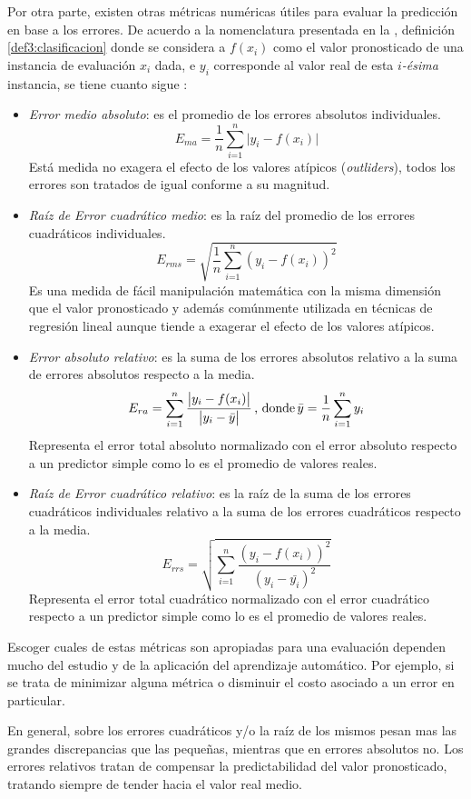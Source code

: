 Por otra parte, existen otras métricas numéricas útiles para evaluar
la predicción en base a los errores. De acuerdo a la nomenclatura
presentada en la , definición \ref{def3:clasificacion}
donde se considera a $f(x_{i})$ como el valor pronosticado de una
instancia de evaluación $x_{i}$ dada, e $y_{i}$ corresponde al valor
real de esta \emph{$i$-ésima} instancia, se tiene cuanto sigue \cite{Witten2017}:
\begin{itemize}
\item \emph{Error medio absoluto}: es el promedio de los errores absolutos
individuales.
\[
E_{ma}=\frac{1}{n}\sum_{i\text{=1}}^{n}\bigl|y_{i}-f(x_{i})\bigr|
\]
Está medida no exagera el efecto de los valores atípicos (\emph{outliders}),
todos los errores son tratados de igual conforme a su magnitud.
\item \emph{Raíz de Error cuadrático medio}: es la raíz del promedio de
los errores cuadráticos individuales.
\[
E_{rms}=\sqrt{\frac{1}{n}\sum_{i\text{=1}}^{n}\left(y_{i}-f(x_{i})\right)^{2}}
\]
Es una medida de fácil manipulación matemática con la misma dimensión
que el valor pronosticado y además comúnmente utilizada en técnicas
de regresión lineal aunque tiende a exagerar el efecto de los valores
atípicos.
\item \emph{Error absoluto relativo}: es la suma de los errores absolutos
relativo a la suma de errores absolutos respecto a la media.
\[
E_{ra}=\sum_{i\text{=1}}^{n}\frac{\bigl|y_{i}-f(x_{i})\bigr|}{\bigl|y_{i}-\bar{y}\bigr|}\,\textrm{, donde\,}\bar{y}=\frac{1}{n}\sum_{i=1}^{n}y_{i}
\]
Representa el error total absoluto normalizado con el error absoluto
respecto a un predictor simple como lo es el promedio de valores reales.
\item \emph{Raíz de Error cuadrático relativo}: es la raíz de la suma de
los errores cuadráticos individuales relativo a la suma de los errores
cuadráticos respecto a la media. 
\[
E_{rrs}=\sqrt{\sum_{i\text{=1}}^{n}\frac{\left(y_{i}-f(x_{i})\right)^{2}}{\left(y_{i}-\bar{y_{i}}\right)^{2}}}
\]
Representa el error total cuadrático normalizado con el error cuadrático
respecto a un predictor simple como lo es el promedio de valores reales.
\end{itemize}
Escoger cuales de estas métricas son apropiadas para una evaluación
dependen mucho del estudio y de la aplicación del aprendizaje automático.
Por ejemplo, si se trata de minimizar alguna métrica o disminuir el
costo asociado a un error en particular. 

En general, sobre los errores cuadráticos y/o la raíz de los mismos
pesan mas las grandes discrepancias que las pequeñas, mientras que
en errores absolutos no. Los errores relativos tratan de compensar
la predictabilidad del valor pronosticado, tratando siempre de tender
hacia el valor real medio. 

